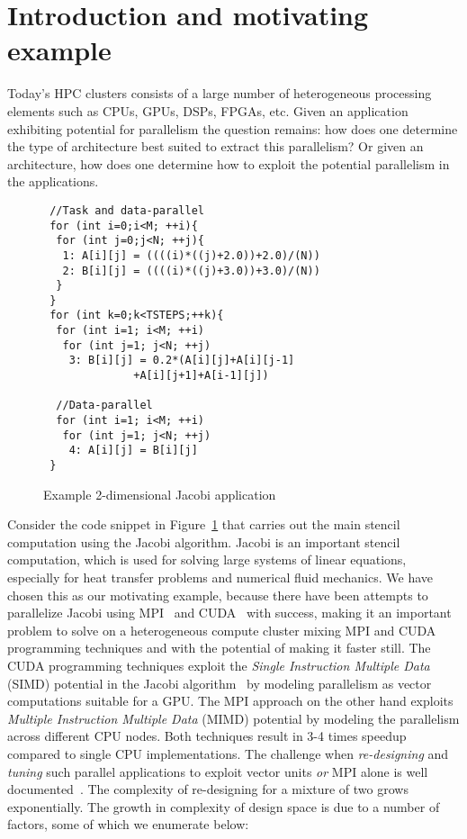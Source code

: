 \section{Introduction and motivating example}
\label{sec:intr-motiv-example}

Today's HPC clusters consists of a large number of heterogeneous
processing elements such as CPUs, GPUs, DSPs, FPGAs, etc. Given an
application exhibiting potential for parallelism the question remains:
how does one determine the type of architecture best suited to extract
this parallelism? Or given an architecture, how does one determine how
to exploit the potential parallelism in the applications.

\begin{scriptsize}
  \begin{figure}[h!]
    \centering
\begin{verbatim}
 //Task and data-parallel
 for (int i=0;i<M; ++i){
  for (int j=0;j<N; ++j){
   1: A[i][j] = ((((i)*((j)+2.0))+2.0)/(N))
   2: B[i][j] = ((((i)*((j)+3.0))+3.0)/(N))
  }
 }
 for (int k=0;k<TSTEPS;++k){
  for (int i=1; i<M; ++i)
   for (int j=1; j<N; ++j)
    3: B[i][j] = 0.2*(A[i][j]+A[i][j-1]
              +A[i][j+1]+A[i-1][j])

  //Data-parallel
  for (int i=1; i<M; ++i)
   for (int j=1; j<N; ++j)
    4: A[i][j] = B[i][j]
 }
\end{verbatim}
    \caption{Example 2-dimensional Jacobi application}
    \label{fig:2}
  \end{figure}
\end{scriptsize}

Consider the code snippet in Figure~\ref{fig:2} that carries out the
main stencil computation using the Jacobi algorithm. Jacobi is an
important stencil computation, which is used for solving large systems
of linear equations, especially for heat transfer problems and numerical
fluid mechanics. We have chosen this as our motivating example, because
there have been attempts to parallelize Jacobi using MPI~\cite{jacobi1}
and CUDA~\cite{jacobi2} with success, making it an important problem to
solve on a heterogeneous compute cluster mixing MPI and CUDA programming
techniques and with the potential of making it faster still. The CUDA
programming techniques exploit the \textit{Single Instruction Multiple
  Data} (SIMD) potential in the Jacobi algorithm~\cite{jacobi2} by
modeling parallelism as vector computations suitable for a GPU. The MPI
approach on the other hand exploits \textit{Multiple Instruction
  Multiple Data} (MIMD) potential by modeling the parallelism across
different CPU nodes. Both techniques result in 3-4 times speedup
compared to single CPU implementations. The challenge when
\textit{re-designing} and \textit{tuning} such parallel applications to
exploit vector units \textit{or} MPI alone is well
documented~\cite{jacobi1,jacobi2}. The complexity of re-designing for a
mixture of two grows exponentially. The growth in complexity of design
space is due to a number of factors, some of which we enumerate below:

